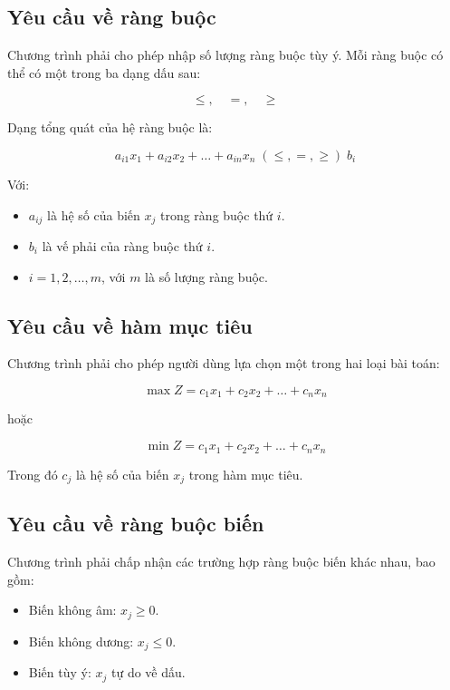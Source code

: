 \documentclass[14pt, a4paper]{extarticle}
\begin{document}
    \subsection{Yêu cầu về ràng buộc}
    
    Chương trình phải cho phép nhập số lượng ràng buộc tùy ý. Mỗi ràng buộc có thể có một trong ba dạng dấu sau:
    
    \[
    \leq, \quad =, \quad \geq
    \]
    
    Dạng tổng quát của hệ ràng buộc là:
    
    \[
    a_{i1}x_1 + a_{i2}x_2 + \ldots + a_{in}x_n \; (\leq, =, \geq) \; b_i
    \]
    
    Với:
    
    \begin{itemize}
        \item $a_{ij}$ là hệ số của biến $x_j$ trong ràng buộc thứ $i$.
        \item $b_i$ là vế phải của ràng buộc thứ $i$.
        \item $i = 1, 2, \ldots, m$, với $m$ là số lượng ràng buộc.
    \end{itemize}
    
    \subsection{Yêu cầu về hàm mục tiêu}
    
    Chương trình phải cho phép người dùng lựa chọn một trong hai loại bài toán:
    
    \[
    \max Z = c_1x_1 + c_2x_2 + \ldots + c_nx_n
    \]
    
    hoặc
    
    \[
    \min Z = c_1x_1 + c_2x_2 + \ldots + c_nx_n
    \]
    
    Trong đó $c_j$ là hệ số của biến $x_j$ trong hàm mục tiêu.
    
    \subsection{Yêu cầu về ràng buộc biến}
    
    Chương trình phải chấp nhận các trường hợp ràng buộc biến khác nhau, bao gồm:
    
    \begin{itemize}
        \item Biến không âm: $x_j \geq 0$.
        \item Biến không dương: $x_j \leq 0$.
        \item Biến tùy ý: $x_j$ tự do về dấu.
    \end{itemize}
    
\end{document}
